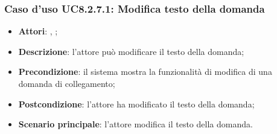 	\subsubsection{Caso d'uso UC8.2.7.1: Modifica testo della domanda}
	\label{UC8.2.7.1}
	\begin{itemize}
		\item
		\textbf{Attori}: \uau, \uaupro;
		\item		
		\textbf{Descrizione}: l'attore può modificare il testo della domanda;
		\item
		\textbf{Precondizione}: il sistema mostra la funzionalità di modifica di una domanda di collegamento; 
		\item
		\textbf{Postcondizione}: l'attore ha modificato il testo della domanda;
		\item
		\textbf{Scenario principale}: l'attore modifica il testo della domanda.	
	\end{itemize}

